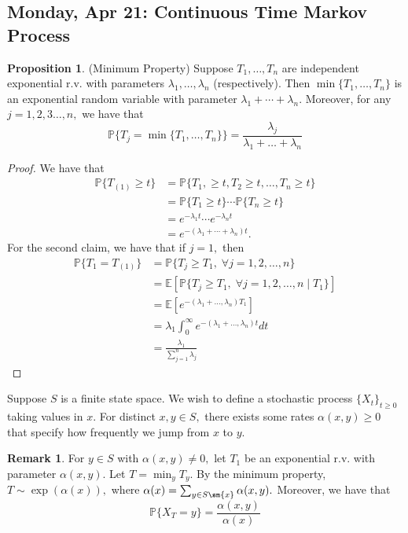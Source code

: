 \documentclass[10pt, oneside]{article}
\newcommand{\bbP}{\mathbb{P}}
\newcommand{\bbE}{\mathbb{E}}
\theoremstyle{definition}
\newtheorem{prop}{Proposition}
\newtheorem{rem}{Remark}
\begin{document}
\newpage
\subsection{Monday, Apr 21: Continuous Time Markov Process}
\begin{prop}
    (Minimum Property) Suppose $T_1, \dots, T_n$ are independent exponential r.v. with parameters $\lambda_1, \dots, \lambda_n$ (respectively). Then $\min\{T_1, \dots, T_n\}$ is an exponential random variable with parameter $\lambda_1 + \cdots + \lambda_n.$ Moreover, for any $j  = 1,2,3\dots, n,$ we have that
    \[\bbP\{T_j = \min\{T_1, \dots, T_n\}\} = \frac{\lambda_j}{\lambda_1 + \dots + \lambda_n}\]
\end{prop} 
\begin{proof}
    We have that 
    \begin{align*}
        \bbP\{T_{(1)}\geq t\} &= \bbP\{T_1, \geq t, T_2 \geq t, \dots , T_n \geq t\}\\
        &= \bbP\{T_1 \geq t\}\cdots \bbP\{T_n \geq t\}\\
        &= e^{-\lambda_1 t}\cdots e^{-\lambda_n t}\\
        &= e^{-(\lambda_1 + \cdots + \lambda_n)t}.
    \end{align*}
    For the second claim, we have that if $j=1,$ then 
    \begin{align*}
        \bbP\{T_1 = T_{(1)}\} &= \bbP\{T_j \geq T_1, \;\forall j = 1,2,\dots, n\}\\
        &= \bbE[\bbP\{T_j \geq T_1, \;\forall j = 1,2,\dots, n \mid T_1\}]\\
        &=  \bbE[e^{-(\lambda_1 + \dots, \lambda_n)T_1}]\\
        &= \lambda_1\int_{0}^\infty e^{-(\lambda_1 + \dots, \lambda_n)t}dt\\
        &= \frac{\lambda_1}{\sum_{j=1}^n\lambda_j}
    \end{align*}
    
\end{proof}

Suppose $S$ is a finite state space. We wish to define a stochastic process $\{X_t\}_{t\geq 0}$ taking values in $x.$ For distinct $x,y \in S,$ there exists some rates $\alpha(x,y) \geq 0 $ that specify how frequently we jump from $x$ to $y$.
\begin{rem}
    For $y \in S$ with $\alpha(x,y) \neq 0,$ let $T_1$ be an exponential r.v. with parameter $\alpha(x,y).$  Let $T = \min_y T_y.$ By the minimum property, $T\sim \exp(\alpha(x)),$ where $\alpha(x) = \sum_{y \in S\sm \{x\}}\alpha(x,y).$ Moreover, we have that 
    \[\bbP\{X_T = y\} = \frac{\alpha(x,y)}{\alpha(x)}\]
\end{rem}
\end{document}
